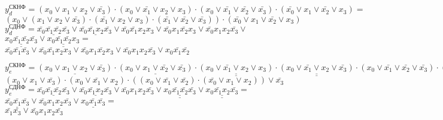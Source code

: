 \documentclass{bmstu}
\begin{document}
	\begin{center}
       $y^{\text{СКНФ}}_d = (x_0 \vee x_1 \vee x_2 \vee \bar{x_3}) \cdot
							(x_0 \vee \bar{x_1} \vee x_2 \vee x_3) \cdot 
							(x_0 \vee \bar{x_1} \vee \bar{x_2} \vee \bar{x_3}) \cdot 
							(\bar{x_0} \vee x_1  \vee \bar{x_2} \vee x_3) = $ \\
	   $(x_0 \vee (x_1 \vee x_2 \vee \bar{x_3}) \cdot 
	   			  (\bar{x_1} \vee x_2 \vee x_3) \cdot 
	   			  (\bar{x_1} \vee \bar{x_2} \vee \bar{x_3})
	    ) \cdot (\bar{x_0} \vee x_1  \vee \bar{x_2} \vee x_3)$ \\   
	   $y^{\text{СДНФ}}_d = \underline{\bar{x_0} \bar{x_1} \bar{x_2} \bar{x_3}} \vee
							\underline{\bar{x_0} \bar{x_1} x_2 \bar{x_3}} \vee 
							\bar{x_0} \bar{x_1} x_2 x_3 \vee
							\bar{x_0} x_1 \bar{x_2} x_3 \vee 
							\bar{x_0} x_1 x_2 \bar{x_3} \vee$ 
							$\underline{\underline{x_0 \bar{x_1} \bar{x_2} \bar{x_3}}} \vee 
							\underline{\underline{x_0 \bar{x_1} \bar{x_2} x_3}} = $ \\
	   $\bar{x_0} \bar{x_1} \bar{x_3} \vee
	    \bar{x_0} \bar{x_1} x_2 x_3 \vee
	    \bar{x_0} x_1 \bar{x_2} x_3 \vee 
	    \bar{x_0} x_1 x_2 \bar{x_3} \vee 
	    x_0 \bar{x_1} \bar{x_2}$				
	\end{center}


	\begin{center}
		$y^{\text{СКНФ}}_e = \underline{(x_0 \vee x_1 \vee x_2 \vee \bar{x_3})} \cdot
							 \underline{(x_0 \vee x_1 \vee \bar{x_2} \vee \bar{x_3})} \cdot
							 \underline{\underline{(x_0 \vee \bar{x_1} \vee x_2 \vee x_3)}} \cdot 
							 \underline{\underline{(x_0 \vee \bar{x_1} \vee x_2 \vee \bar{x_3})}} \cdot 
							 (x_0 \vee \bar{x_1} \vee \bar{x_2} \vee \bar{x_3}) \cdot 
							 (\bar{x_0} \vee x_1 \vee x_2 \vee \bar{x_3}) = $ \\
		$(x_0 \vee x_1 \vee \bar{x_3}) \cdot 
		 (x_0 \vee \bar{x_1} \vee x_2) \cdot
		 ((x_0 \vee \bar{x_1} \vee \bar{x_2}) \cdot (\bar{x_0} \vee x_1 \vee x_2)) \vee \bar{x_3}$ \\		             
		$y^{\text{СДНФ}}_e = \underline{\bar{x_0} \bar{x_1} \bar{x_2} \bar{x_3}} \vee
							 \underline{\bar{x_0} \bar{x_1} x_2 \bar{x_3}} \vee 
						     \bar{x_0} x_1 x_2 \bar{x_3} \vee
							 \underline{\underline{x_0 \bar{x_1} \bar{x_2} \bar{x_3}}} \vee
							 \underline{\underline{x_0 \bar{x_1} x_2 \bar{x_3}}} = $ \\
	   $\underline{\bar{x_0} \bar{x_1} \bar{x_3}} \vee
	    \bar{x_0} x_1 x_2 \bar{x_3} \vee
	    \underline{x_0 \bar{x_1} \bar{x_3}} = $ \\
	   $\bar{x_1} \bar{x_3} \vee
	    \bar{x_0} x_1 x_2 \bar{x_3}$
	\end{center}
\end{document}
